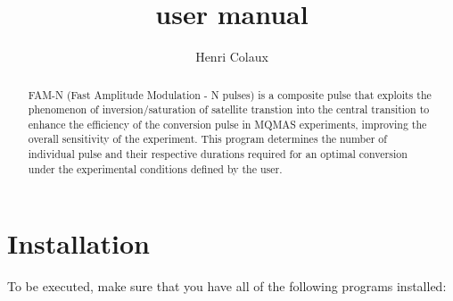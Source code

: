 \documentclass[10pt,a4paper]{article}
\author{Henri Colaux}
\title{\pythoncode{famn_opt v0.3.2a} user manual}
\begin{document}
\maketitle 
\begin{abstract}
FAM-N (Fast Amplitude Modulation - N pulses) is a composite pulse that exploits the phenomenon of inversion/saturation of satellite transtion into the central transition to enhance the efficiency of the conversion pulse in MQMAS experiments, improving the overall sensitivity of the experiment. This program determines the number of individual pulse and their respective durations required for an optimal conversion under the experimental conditions defined by the user.
\end{abstract}

\tableofcontents

\section{Installation}

To be executed, make sure that you have all of the following programs installed:
\end{document}
